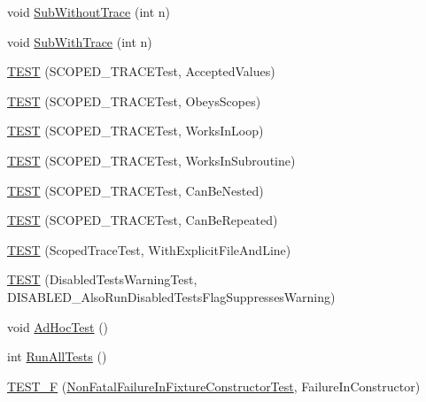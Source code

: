 \begin{DoxyCompactItemize}
\item 
void \mbox{\hyperlink{googletest-output-test___8cc_a7e222b468bbde7215ce826f10993e746}{Sub\+Without\+Trace}} (int n)
\item 
void \mbox{\hyperlink{googletest-output-test___8cc_a543ee38e0824e47113bb12c3277e09ae}{Sub\+With\+Trace}} (int n)
\item 
\mbox{\hyperlink{googletest-output-test___8cc_a81f7d012241339866fccb3c3750b553b}{T\+E\+ST}} (S\+C\+O\+P\+E\+D\+\_\+\+T\+R\+A\+C\+E\+Test, Accepted\+Values)
\item 
\mbox{\hyperlink{googletest-output-test___8cc_a82f82f6a7caa426cccf8d20113f897c0}{T\+E\+ST}} (S\+C\+O\+P\+E\+D\+\_\+\+T\+R\+A\+C\+E\+Test, Obeys\+Scopes)
\item 
\mbox{\hyperlink{googletest-output-test___8cc_a46dcedbe67765adaebc7740ee17a88de}{T\+E\+ST}} (S\+C\+O\+P\+E\+D\+\_\+\+T\+R\+A\+C\+E\+Test, Works\+In\+Loop)
\item 
\mbox{\hyperlink{googletest-output-test___8cc_a492695898501cea9f99ccd690c2b3991}{T\+E\+ST}} (S\+C\+O\+P\+E\+D\+\_\+\+T\+R\+A\+C\+E\+Test, Works\+In\+Subroutine)
\item 
\mbox{\hyperlink{googletest-output-test___8cc_ae402e91f305e54f5f14a172a0fb0831b}{T\+E\+ST}} (S\+C\+O\+P\+E\+D\+\_\+\+T\+R\+A\+C\+E\+Test, Can\+Be\+Nested)
\item 
\mbox{\hyperlink{googletest-output-test___8cc_a49c4610eeb41adaa369f9dce003d5198}{T\+E\+ST}} (S\+C\+O\+P\+E\+D\+\_\+\+T\+R\+A\+C\+E\+Test, Can\+Be\+Repeated)
\item 
\mbox{\hyperlink{googletest-output-test___8cc_aff587c2c7d3e81f4d94425987ca07bc1}{T\+E\+ST}} (Scoped\+Trace\+Test, With\+Explicit\+File\+And\+Line)
\item 
\mbox{\hyperlink{googletest-output-test___8cc_a2bdac0e0076d65fa77a967c0fdb46e2a}{T\+E\+ST}} (Disabled\+Tests\+Warning\+Test, D\+I\+S\+A\+B\+L\+E\+D\+\_\+\+Also\+Run\+Disabled\+Tests\+Flag\+Suppresses\+Warning)
\item 
void \mbox{\hyperlink{googletest-output-test___8cc_a36cd4d21174efaa3066237d716028d49}{Ad\+Hoc\+Test}} ()
\item 
int \mbox{\hyperlink{googletest-output-test___8cc_ae0ca194f6b730e168850ce3179ad4f63}{Run\+All\+Tests}} ()
\item 
\mbox{\hyperlink{googletest-output-test___8cc_ad122def39d78da61690433e185611737}{T\+E\+S\+T\+\_\+F}} (\mbox{\hyperlink{classNonFatalFailureInFixtureConstructorTest}{Non\+Fatal\+Failure\+In\+Fixture\+Constructor\+Test}}, Failure\+In\+Constructor)
\item 

\end{DoxyCompactItemize}
